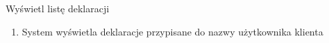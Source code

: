 	\begin{usecase}{Wyświetl listę deklaracji}
		\author{Beata Obrok}
		\maketitle
		\begin{scenario}
			\begin{enumerate}
				\item System wyświetla deklaracje przypisane do nazwy użytkownika klienta
			\end{enumerate}
		\end{scenario}
\end{usecase}

